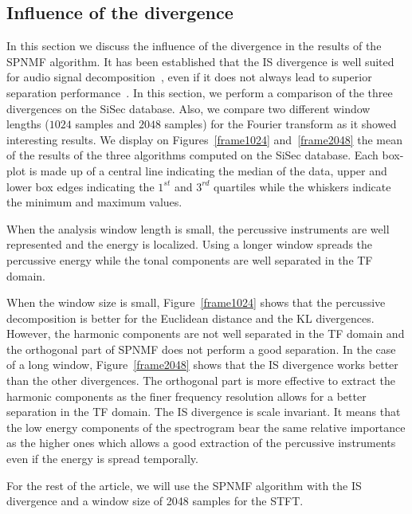 \subsection{Influence of the divergence}
\label{setup:divergence}

In this section we discuss the influence of the divergence in the results of the SPNMF algorithm. It has been established that the IS divergence is well suited for audio signal decomposition~\cite{gray1980distortion}, even if it does not always lead to superior separation performance~\cite{canadas2014percussive}. In this section, we perform a comparison of the three divergences on the SiSec database. Also, we compare two different window lengths ($1024$ samples and $2048$ samples) for the Fourier transform as it showed interesting results. We display on Figures~\ref{frame1024} and~\ref{frame2048} the mean of the results of the three algorithms computed on the SiSec database. Each box-plot is made up of a central line indicating the median of the data, upper and lower box edges indicating the $1^{st}$ and $3^{rd}$ quartiles while the whiskers indicate the minimum and maximum values. 

When the analysis window length is small, the percussive instruments are well represented and the energy is localized. Using a longer window spreads the percussive energy while the tonal components are well separated in the TF domain.

When the window size is small, Figure~\ref{frame1024} shows that the percussive decomposition is better for the Euclidean distance and the KL divergences. However, the harmonic components are not well separated in the TF domain and the orthogonal part of SPNMF does not perform a good separation.  
In the case of a long window, Figure~\ref{frame2048} shows that the IS divergence works better than the other divergences. The orthogonal part is more effective to extract the harmonic components as the finer frequency resolution allows for a better separation in the TF domain. The IS divergence is scale invariant. It means that the low energy components of the spectrogram bear the same relative importance as the higher ones which allows a good extraction of the percussive instruments even if the energy is spread temporally.


For the rest of the article, we will use the SPNMF algorithm with the IS divergence and a window size of 2048 samples for the STFT.


